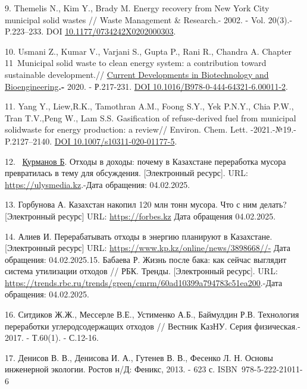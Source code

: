 \begin{references}
9. Themelis N., Kim Y., Brady M. Energy recovery from New York City
municipal solid wastes // Waste Management \& Research.- 2002. - Vol.
20(3).- P.223--233. DOI
\href{http://dx.doi.org/10.1177/0734242X0202000303}{10.1177/0734242X0202000303}.

10. Usmani Z., Kumar V., Varjani S., Gupta P., Rani R., Chandra A.
Chapter 11~Municipal solid waste to clean energy system: a
contribution toward sustainable development.//
\href{https://www.sciencedirect.com/book/9780444643216/current-developments-in-biotechnology-and-bioengineering}{Current
Developments in Biotech\-nology and Bioengineering}{\bfseries .-} 2020. -
Р.217-231. \href{https://doi.org/10.1016/B978-0-444-64321-6.00011-2}{DOI
10.1016/B978-0-444-64321-6.00011-2}.

11. Yang Y., Liew,R.K., Tamothran A.M., Foong S.Y., Yek P.N.Y., Chia
P.W., Tran T.V.,Peng W., Lam S.S. Gasification of refuse-derived fuel
from municipal solidwaste for energy production: a review// Environ.
Chem. Lett. -2021.-№19.- P.2127--2140.
\href{https://doi.org/10.1007/s10311-020-01177-5}{DOI
10.1007/s10311-020-01177-5}.

12. ~\href{https://ulysmedia.kz/author/21/}{Курманов Б}. Отходы в
доходы: почему в Казахстане переработка мусора превратилась в тему для
обсуждения. {[}Электронный ресурс{]}. URL:
\href{https://ulysmedia.kz/analitika/11719-otkhody-v-dokhody-pochemu-v-kazakhstane-pererabotka-musora-prevratilas-v-temu-dlia-obsuzhdeniia/}{https://ulysmedia.kz}.-Дата
обращения: 04.02.2025.

13. Горбунова А. Казахстан накопил 120 млн тонн мусора. Что с ним
делать? {[}Электронный ресурс{]} URL:
\href{https://forbes.kz/process/ecobusiness/kazahstan_nakopil_120_mln_tonn_byitovogo_musora_chto_s_nim_delat/}{https://forbes.kz}
Дата обращения 04.02.2025.

14. Алиев И. Перерабатывать отходы в энергию планируют в Казахстане.
{[}Электронный ресурс{]} URL:
\url{https://www.kp.kz/online/news/3898668//-} Дата обращения:
04.02.2025.15. Бабаева Р. Жизнь после бака: как сейчас выглядит система утилизации
отходов // РБК. Тренды. {[}Электронный ресурс{]}. URL:
\url{https://trends.rbc.ru/trends/green/cmrm/60ad10399a794783c51ea200}.-Дата
обращения: 04.02.2025.

16. Ситдиков Ж.Ж., Мессерле В.Е., Устименко А.Б., Баймулдин Р.В.
Технология переработки углеродсодержащих отходов // Вестник КазНУ. Серия
физическая.- 2017. - Т.60(1). - С.12-16.

17. Денисов В. В., Денисова И. А., Гутенев В. В., Фесенко Л. Н. Основы
инженерной экологии. Ростов н/Д: Феникс, 2013. - 623 с.
ISBN~978-5-222-21011-6


\end{references}
